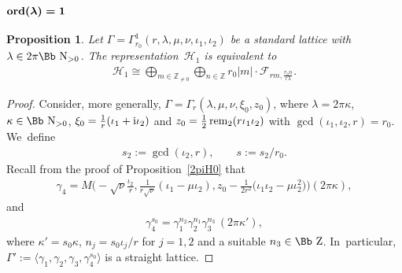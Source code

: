\documentclass[pdftex]{sigma}
\newcommand\NN{{\mbox{\Bb N}}}
\newcommand\ZZ{{\mbox{\Bb Z}}}
\newcommand\Z{{\mathbb Z}}
\newcommand\cH{{\mathcal H}}
\newcommand{\rem}{\mathop{{\rm rem}}}
\newcommand{\ord}{{\rm ord}}
\newcommand\la{\langle}
\newcommand\ra{\rangle}
\numberwithin{equation}{section}
\newtheorem{Proposition}[Theorem]{Proposition}
 { \theoremstyle{definition}
\newtheorem{Definition}[Theorem]{Definition}
\newtheorem{Note}[Theorem]{Note}
\newtheorem{Example}[Theorem]{Example}
\newtheorem{Remark}[Theorem]{Remark} }
\begin{document}
\subsubsection[$\ord(\lambda)=1$]{$\boldsymbol{\ord(\lambda)=1}$}

\begin{Proposition}\label{pr:2piH1} Let $\Gamma=\Gamma_{r_0}^1(r,\lambda,\mu,\nu,\iota_1,\iota_2)$ be a standard lattice with $\lambda\in2\pi\NN_{>0}$. The representation~$\cH_1$ is equivalent to
\begin{gather*}
\cH_1\cong\bigoplus_{m\in\Z _{\not=0}}\bigoplus_{n\in \Z} r_0|m|\cdot {\mathcal F}_{rm,\frac{r_0n}{r\lambda}}.
\end{gather*}
\end{Proposition}
\begin{proof}
Consider, more generally, $\Gamma=\Gamma_r(\lambda,\mu,\nu,\xi_0,z_0)$, where $\lambda=2\pi\kappa$, $\kappa\in\NN_{>0}$, $\xi_0=\frac 1r(\iota_1+{\rm i}\iota_2)$ and $z_0=\frac12\rem_2(r\iota_1\iota_2)$ with $\gcd(\iota_1,\iota_2,r)=r_0$. We~define
\begin{gather*}
s_2:=\gcd(\iota_2,r),\qquad s:=s_2/r_0.
\end{gather*}
Recall from the proof of Proposition~\ref{2piH0} that
\begin{gather*}
\gamma_4=M\bigg({-}\sqrt\nu\frac{\iota_2}{r},\frac{1}{r\sqrt\nu}(\iota_1-\mu\iota_2), z_0-\frac{1}{2r^2}\big(\iota_1\iota_2-\mu\iota_2^2\big)\bigg)(2\pi\kappa),
\end{gather*}
and
\begin{gather*}
\gamma_4^{s_0}=\gamma_1^{n_2}\gamma_2^{n_1}\gamma_3^{n_3}\,(2\pi\kappa'),
\end{gather*}
where $\kappa'=s_0\kappa$, $n_j=s_0\iota_j/r$ for $j=1,2$ and a suitable $n_3\in\ZZ$. In~particular, $\Gamma':=\la \gamma_1, \gamma_2, \gamma_3,\gamma_4^{s_0}\ra$ is a straight lattice.


\end{proof}
\end{document}
